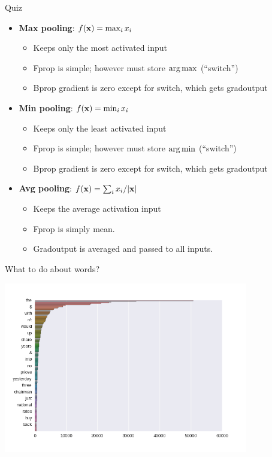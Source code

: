 \documentclass{beamer}
\begin{document}
\begin{frame}{Quiz}
  \begin{itemize}
  \item \textbf{Max pooling}:  $f(\mathbf{x}) = \max_{i} x_i$

    \begin{itemize}
    \item Keeps only the most activated input
    \item Fprop is simple; however must store $\argmax$ (``switch'')
    \item Bprop gradient is zero except for switch, which gets gradoutput
    \end{itemize}
    \pause

  \item \textbf{Min pooling}: $ f(\mathbf{x}) = \min_{i} x_i $
    \begin{itemize}
    \item Keeps only the least activated input
    \item Fprop is simple; however must store $\argmin$ (``switch'')
    \item Bprop gradient is zero except for switch, which gets gradoutput
    \end{itemize}
    \pause

  \item \textbf{Avg pooling}: $ f(\mathbf{x}) = \sum_i x_i / |\mathbf{x}| $
    \begin{itemize}
    \item Keeps the average activation input
    \item Fprop is simply mean.
    \item Gradoutput is averaged and passed to all inputs.
    \end{itemize}
  \end{itemize}
\end{frame}

\begin{frame}{What to do about words?}
  \begin{center}
    \includegraphics[width=0.8\textwidth]{../notebooks/zipf}
  \end{center}
\end{frame}
\end{document}
